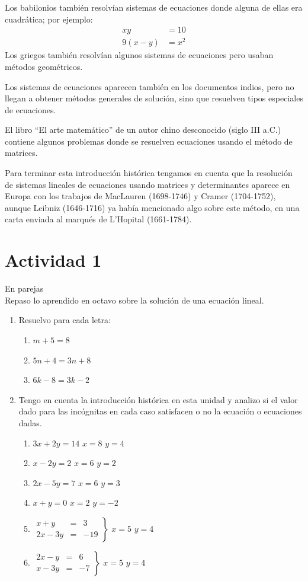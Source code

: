 \documentclass[letterpaper,11pt]{article}
\begin{document}
\begin{multicols}{2}
Los babilonios también resolvían sistemas de ecuaciones donde alguna de ellas
era cuadrática; por ejemplo:
\begin{align}
xy&=10\label{eq:3}\\
9(x-y)&=x^{2}\label{eq:4}
\end{align}
Los griegos también resolvían algunos sistemas de ecuaciones pero usaban
métodos geométricos.

Los sistemas de ecuaciones aparecen también en los documentos indios, pero no llegan a obtener métodos generales de solución, sino que resuelven tipos especiales de ecuaciones.

El libro “El arte matemático” de un autor chino desconocido (siglo III a.C.) contiene algunos problemas donde se resuelven ecuaciones usando el método de matrices.

Para terminar esta introducción histórica tengamos en cuenta que la resolución de sistemas lineales de ecuaciones usando matrices y determinantes aparece en Europa con los trabajos de MacLauren (1698-1746) y Cramer (1704-1752), aunque Leibniz (1646-1716) ya había mencionado algo sobre este método, en una carta enviada al marqués de L'Hopital (1661-1784).
\section*{Actividad 1}
En parejas\\
Repaso lo aprendido en octavo sobre la solución de una ecuación lineal.
\begin{enumerate}
\item Resuelvo para cada letra:
\begin{enumerate}
\item $m+5=8$
\item $5n+4=3n+8$
\item $6k-8=3k-2$
\end{enumerate}
\item Tengo en cuenta la introducción histórica en esta unidad y analizo si el valor dado para las incógnitas en cada caso satisfacen o no la ecuación o
ecuaciones dadas.
\begin{enumerate}
\item $3x+2y=14$ \qquad $x=8$ \qquad $y=4$
\item $x-2y=2$ \qquad $x=6$ \qquad $y=2$
\item $2x-5y=7$ \qquad $x=6$ \qquad $y=3$
\item $x+y=0$ \qquad $x=2$ \qquad $y=-2$
\item $\left.\begin{array}{lcl}
x+y&=&3\\
2x-3y&=&-19 
\end{array}\right\}$ \qquad $x=5$  \qquad $y=4$
\item $\left.\begin{array}{lcl}
2x-y&=&6\\
x-3y&=&-7
\end{array}\right\}$ \qquad $x=5$ \qquad $y=4$
\end{enumerate}
\end{enumerate}

\end{multicols}
\end{document}
